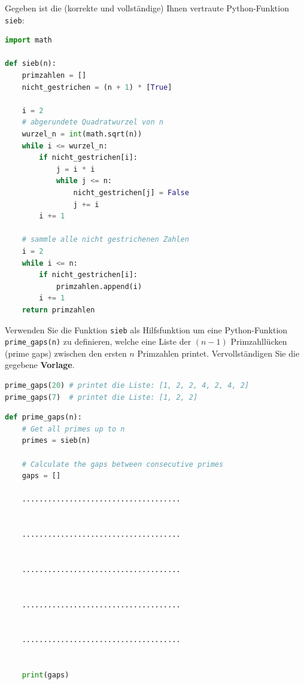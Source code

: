 \begin{questions}
	\question[2]
	Gegeben ist die (korrekte und vollständige) Ihnen vertraute Python-Funktion \lstinline|sieb|:
	\begin{lstlisting}[language=Python,caption=Sieb,numbers=none]
import math

def sieb(n):
    primzahlen = []
    nicht_gestrichen = (n + 1) * [True]

    i = 2
    # abgerundete Quadratwurzel von n
    wurzel_n = int(math.sqrt(n))
    while i <= wurzel_n:
        if nicht_gestrichen[i]:
            j = i * i
            while j <= n:
                nicht_gestrichen[j] = False
                j += i
        i += 1

    # sammle alle nicht gestrichenen Zahlen
    i = 2
    while i <= n:
        if nicht_gestrichen[i]:
            primzahlen.append(i)
        i += 1
    return primzahlen
\end{lstlisting}
	Verwenden Sie die Funktion \lstinline|sieb| als Hilfsfunktion um eine Python-Funktion \lstinline|prime_gaps(n)| zu definieren, welche eine Liste der $(n - 1)$ Primzahllücken (prime gaps) zwischen den ersten $n$ Primzahlen printet. Vervollständigen Sie die gegebene \textbf{Vorlage}.

	\begin{lstlisting}[language=Python,caption=Beispiele,numbers=none]
prime_gaps(20) # printet die Liste: [1, 2, 2, 4, 2, 4, 2]
prime_gaps(7)  # printet die Liste: [1, 2, 2]
\end{lstlisting}

	\clearpage

	\begin{lstlisting}[language=Python,caption=prime gaps (noch zu vervollständigen),numbers=none]
def prime_gaps(n):
    # Get all primes up to n
    primes = sieb(n)

    # Calculate the gaps between consecutive primes
    gaps = []

    ..................................... 
    

    ..................................... 
    

    ..................................... 


    ..................................... 
    

    ..................................... 
    

    print(gaps)
\end{lstlisting}

\end{questions}

